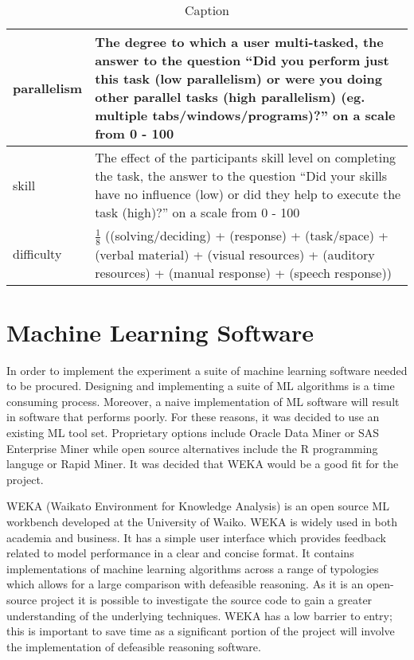 \begin{table}[]
\begin{tabular}{|l|p{8cm}|}
 parallelism & The degree to which a user multi-tasked, the answer to the question ``Did you perform just this task (low parallelism) or were you doing other parallel tasks (high parallelism) (eg. multiple tabs/windows/programs)?'' on a scale from 0 - 100 \\ \hline
 skill & The effect of the participants skill level on completing the task, the answer to the question ``Did your skills have no influence (low) or did they help to execute the task (high)?'' on a scale from 0 - 100 \\ \hline
 difficulty & \( \frac{1}{8} \) ((solving/deciding) + (response) + (task/space) + (verbal material) + (visual resources) + (auditory resources) + (manual response) + (speech response)) \\ \hline
 
\end{tabular}
\caption{Caption}
\label{tab:my_label}
\end{table}

\section{Machine Learning Software}

In order to implement the experiment a suite of machine learning software needed to be procured. Designing and implementing a suite of ML algorithms is a time consuming process. Moreover, a naive implementation of ML software will result in software that performs poorly. For these reasons, it was decided to use an existing ML tool set. Proprietary options include Oracle Data Miner or SAS Enterprise Miner while open source alternatives include the R programming languge or Rapid Miner. It was decided that WEKA would be a good fit for the project. 

WEKA (Waikato Environment for Knowledge Analysis) is an open source ML workbench developed at the University of Waiko. WEKA is widely used in both academia and business. It has a simple user interface which provides feedback related to model performance in a clear and concise format. It contains implementations of machine learning algorithms across a range of typologies which allows for a large comparison with defeasible reasoning. As it is an open-source project it is possible to investigate the source code to gain a greater understanding of the underlying techniques. WEKA has a low barrier to entry; this is important to save time as a significant portion of the project will involve the implementation of defeasible reasoning software.

